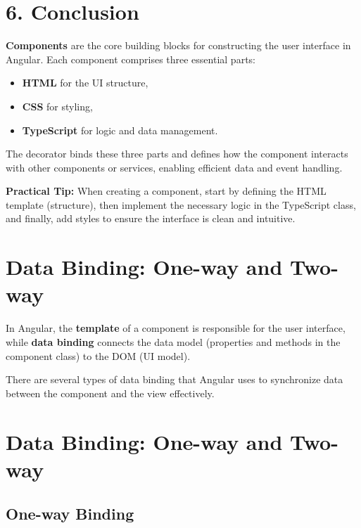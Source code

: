 \documentclass{article}
\begin{document}
\section*{6. Conclusion}

\textbf{Components} are the core building blocks for constructing the user interface in Angular. Each component comprises three essential parts:
\begin{itemize}
  \item \textbf{HTML} for the UI structure,
  \item \textbf{CSS} for styling,
  \item \textbf{TypeScript} for logic and data management.
\end{itemize}

The \@Component decorator binds these three parts and defines how the component interacts with other components or services, enabling efficient data and event handling.

\textbf{Practical Tip:} When creating a component, start by defining the HTML template (structure), then implement the necessary logic in the TypeScript class, and finally, add styles to ensure the interface is clean and intuitive.

\section{Data Binding: One-way and Two-way}

In Angular, the \textbf{template} of a component is responsible for the user interface, while \textbf{data binding} connects the data model (properties and methods in the component class) to the DOM (UI model). 

There are several types of data binding that Angular uses to synchronize data between the component and the view effectively.

\section{Data Binding: One-way and Two-way}

\subsection{One-way Binding}
\end{document}
